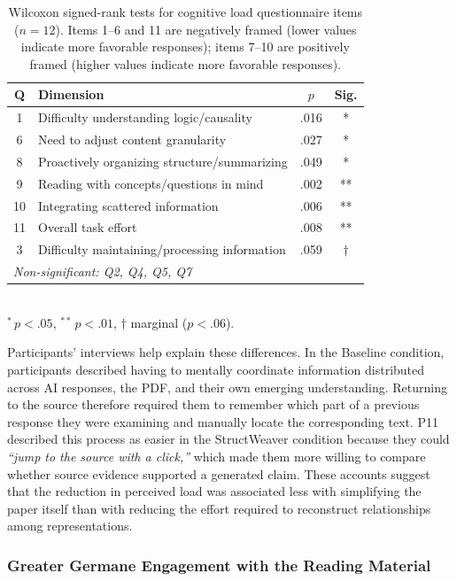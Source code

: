 \documentclass[manuscript,review,anonymous]{acmart}
\begin{document}
\begin{table}[t]
\centering
\caption{Wilcoxon signed-rank tests for cognitive load questionnaire items ($n=12$). Items 1--6 and 11 are negatively framed (lower values indicate more favorable responses); items 7--10 are positively framed (higher values indicate more favorable responses).}
\label{tab:survey_stats}
\small
\begin{tabularx}{\linewidth}{c X c c}
\toprule
Q & Dimension & $p$ & Sig. \\
\midrule
1 & Difficulty understanding logic/causality & .016 & * \\
6 & Need to adjust content granularity & .027 & * \\
8 & Proactively organizing structure/summarizing & .049 & * \\
9 & Reading with concepts/questions in mind & .002 & ** \\
10 & Integrating scattered information & .006 & ** \\
11 & Overall task effort & .008 & ** \\
\midrule
3 & Difficulty maintaining/processing information & .059 & $\dagger$ \\
\multicolumn{4}{l}{\textit{Non-significant: Q2, Q4, Q5, Q7}} \\
\bottomrule
\end{tabularx}
\\[4pt]
\footnotesize{$^{*}\,p<.05$, $^{**}\,p<.01$, $\dagger$ marginal ($p<.06$).}
\end{table}

Participants' interviews help explain these differences. In the Baseline condition, participants described having to mentally coordinate information distributed across AI responses, the PDF, and their own emerging understanding. Returning to the source therefore required them to remember which part of a previous response they were examining and manually locate the corresponding text. P11 described this process as easier in the StructWeaver condition because they could \textit{``jump to the source with a click,''} which made them more willing to compare whether source evidence supported a generated claim. These accounts suggest that the reduction in perceived load was associated less with simplifying the paper itself than with reducing the effort required to reconstruct relationships among representations.


\subsubsection{Greater Germane Engagement with the Reading Material}
\end{document}

